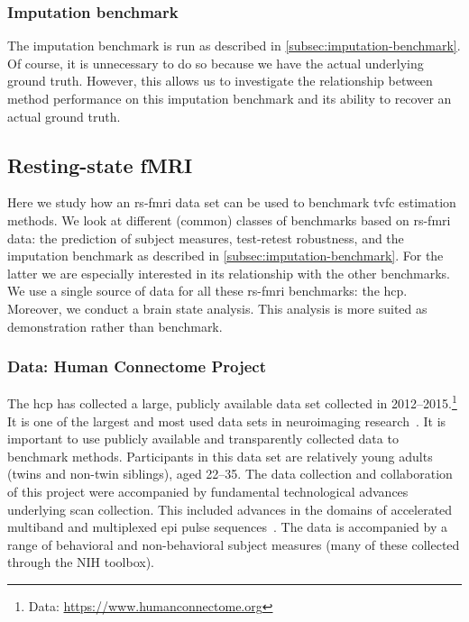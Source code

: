 \subsubsection{Imputation benchmark}

The imputation benchmark is run as described in \cref{subsec:imputation-benchmark}.
Of course, it is unnecessary to do so because we have the actual underlying ground truth.
However, this allows us to investigate the relationship between method performance on this imputation benchmark and its ability to recover an actual ground truth.

\subsection{Resting-state fMRI}

Here we study how an \gls{rs-fmri} data set can be used to benchmark \gls{tvfc} estimation methods.
We look at different (common) classes of benchmarks based on \gls{rs-fmri} data: the prediction of subject measures, test-retest robustness, and the imputation benchmark as described in \cref{subsec:imputation-benchmark}.
For the latter we are especially interested in its relationship with the other benchmarks.
We use a single source of data for all these \gls{rs-fmri} benchmarks: the \gls{hcp}.
Moreover, we conduct a brain state analysis.
This analysis is more suited as demonstration rather than benchmark.

\subsubsection{Data: Human Connectome Project}\label{subsec:data-hcp}

The \gls{hcp} has collected a large, publicly available data set collected in 2012--2015.\footnote{Data: \url{https://www.humanconnectome.org}}
It is one of the largest and most used data sets in neuroimaging research~\parencite{VanEssen2012, VanEssen2013, Elam2021}.
It is important to use publicly available and transparently collected data to benchmark methods.
Participants in this data set are relatively young adults (twins and non-twin siblings), aged 22--35.
The data collection and collaboration of this project were accompanied by fundamental technological advances underlying scan collection.
This included advances in the domains of accelerated multiband and multiplexed \gls{epi} pulse sequences~\parencite{Moeller2010, Feinberg2010, Setsompop2012, Xu2012}.
The data is accompanied by a range of behavioral and non-behavioral subject measures (many of these collected through the NIH toolbox).

